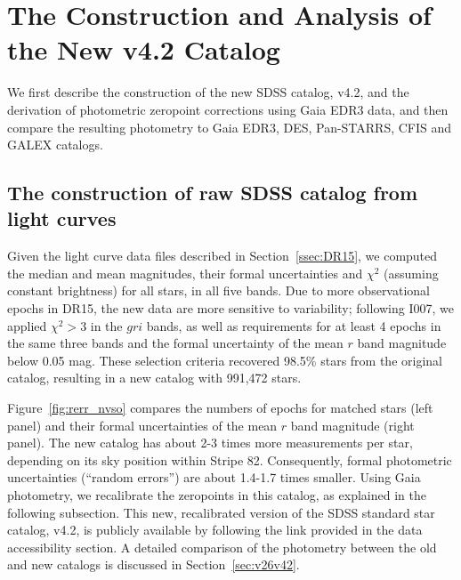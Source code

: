 \documentclass[fleqn,usenatbib]{mnras}
\newcommand{\pO}{\hbox{I007}}
\begin{document}
 
\section{The Construction and Analysis of the New v4.2 Catalog \label{sec:v42}}

We first describe the construction of the new SDSS catalog, v4.2, and the derivation of photometric
zeropoint corrections using Gaia EDR3 data, and then compare the resulting photometry to 
Gaia EDR3, DES, Pan-STARRS, CFIS and GALEX catalogs. 


\subsection{The construction of raw SDSS catalog from light curves \label{sec:averaging}} 

Given the light curve data files described in Section~\ref{ssec:DR15}, we computed the median 
and mean magnitudes, their formal uncertainties and $\chi^2$ (assuming constant brightness)
for all stars, in all five bands. Due to more observational epochs in DR15, the new data are more 
sensitive to variability; following \pO, we applied $\chi^2>3$ in the $gri$ bands, as well as  
requirements for at least 4 epochs in the same three bands and the formal uncertainty of the 
mean $r$ band magnitude below 0.05 mag. These selection criteria recovered 98.5\% stars from
the original catalog, resulting in a new catalog with 991,472 stars. 

Figure~\ref{fig:rerr_nvso} compares the numbers of epochs for matched stars (left panel) and their formal
uncertainties of the mean $r$ band magnitude (right panel). The new catalog has about 2-3 times more 
measurements per star, depending on its sky position within Stripe 82. Consequently,  formal 
photometric uncertainties (``random errors'') are about 1.4-1.7 times smaller. Using Gaia photometry, we recalibrate the zeropoints in this catalog, as explained in the following subsection. This new, recalibrated version of the SDSS standard star catalog, v4.2,  is publicly available by following the link provided in the data accessibility section. A detailed comparison of the photometry between the old and new catalogs is discussed in Section~\ref{sec:v26v42}. 
\end{document}
